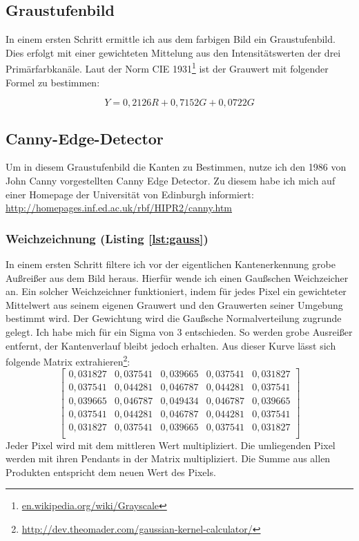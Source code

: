 \subsection{Graustufenbild}
In einem ersten Schritt ermittle ich aus dem farbigen Bild ein Graustufenbild. Dies erfolgt mit einer gewichteten Mittelung aus den Intensitätswerten der drei Primärfarbkanäle. Laut der Norm CIE 1931\footnote{\url{en.wikipedia.org/wiki/Grayscale}} ist der Grauwert mit folgender Formel zu bestimmen:

\begin{equation}
Y = 0,2126R+0,7152G+0,0722G
\end{equation}

\subsection{Canny-Edge-Detector}
Um in diesem Graustufenbild die Kanten zu Bestimmen, nutze ich den 1986 von John Canny vorgestellten Canny Edge Detector. Zu diesem habe ich mich auf einer Homepage der Universität von Edinburgh informiert: \url{http://homepages.inf.ed.ac.uk/rbf/HIPR2/canny.htm}
\subsubsection{Weichzeichnung (Listing \ref{lst:gauss})}
In einem ersten Schritt filtere ich vor der eigentlichen Kantenerkennung grobe Außreißer aus dem Bild heraus. Hierfür wende ich einen Gaußschen Weichzeicher an. Ein solcher Weichzeichner funktioniert, indem für jedes Pixel ein gewichteter Mittelwert aus seinem eigenen Grauwert und den Grauwerten seiner Umgebung bestimmt wird. Der Gewichtung wird die Gaußsche Normalverteilung zugrunde gelegt. Ich habe mich für ein Sigma von 3 entschieden. So werden grobe Ausreißer entfernt, der Kantenverlauf bleibt jedoch erhalten. Aus dieser Kurve lässt sich folgende Matrix extrahieren\footnote{\url{http://dev.theomader.com/gaussian-kernel-calculator/}}:
\begin{equation}
	\begin{bmatrix}
	0,031827&0,037541&0,039665&0,037541&0,031827 \\
	0,037541&0,044281&0,046787&0,044281&0,037541 \\
	0,039665&0,046787&0,049434&0,046787&0,039665 \\
	0,037541&0,044281&0,046787&0,044281&0,037541 \\
	0,031827&0,037541&0,039665&0,037541&0,031827 \\
	\end{bmatrix}
\end{equation}
Jeder Pixel wird mit dem mittleren Wert multipliziert. Die umliegenden Pixel werden mit ihren Pendants in der Matrix multipliziert. Die Summe aus allen Produkten entspricht dem neuen Wert des Pixels.

